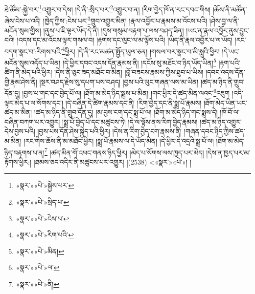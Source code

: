 ཐེ་ཚོམ་:སྐྱེ་བར་\footnote{«སྣར་»«པེ་»སྐྱེས་པར་}འགྱུར་བ་དེས། །དེ་ནི་:སྲིད་པར་\footnote{«སྣར་»«པེ་»སྲིད་པ་}འགྱུར་བ་ན། །རིག་བྱེད་ཁོ་ན་རང་དབང་གིས། །ཆོས་ནི་མཚོན་ཞེས་ངེས་པ་འདི། །ཁྱེད་ཀྱིས་:ངེས་པར་\footnote{«སྣར་»«པེ་»ངེས་པ་}གྲུབ་འགྱུར་མིན། །རྣལ་འབྱོར་པ་རྣམས་མ་འོངས་པའི། །ཤེས་བྱ་ལ་ནི་མངོན་སུམ་གྱིས། །ནུས་པ་ཇི་ལྟར་ཡོད་དེ་ནི། །དུས་གསུམ་བརྟག་པ་ལས་བཤད་ཟིན། །ཡང་ན་རྣལ་འབྱོར་ནུས་བྱུང་བའི། །འདས་དང་མ་འོངས་ལྟར་གསལ་བ། །རྟགས་དང་ལུང་ལ་མ་ལྟོས་པའི། །ཡིད་ནི་རྣལ་འབྱོར་པ་ལ་ཡོད། །རང་བདག་སྣང་བ་:རིགས་པའི་\footnote{«སྣར་»«པེ་»རིག་པའི་}ཕྱིར། །དེ་ནི་རང་མཚན་སྤྱོད་ཡུལ་ཅན། །གསལ་བར་སྣང་བ་མི་སླུའི་ཕྱིར། །དེ་ཡང་མངོན་སུམ་འདོད་པ་ཡིན། །དེ་ཕྱིར་དབང་འདས་དོན་རྣམས་ནི། །དངོས་སུ་མཐོང་བ་ཉིད་ཡོད་ཡིན།\footnote{«སྣར་»«པེ་»མིན།} །རྟག་པའི་ཚིག་ནི་མེད་པའི་ཕྱིར། །དེས་ནི་ཅུང་ཟད་མཐོང་བ་མིན། །བློ་བཟངས་རྣམས་ཀྱིས་ཐུབ་པ་ཡིས། །དབང་འདས་དོན་གྱི་རྣམ་ཤེས་ནི། །སྔར་བཤད་རྗེས་སུ་དཔག་པས་བཤད། །བྱས་པའི་ལུང་གཞན་ལས་མ་ཡིན། །ཚད་མ་ཉིད་ནི་གྲུབ་དོན་དུ། །བྱས་པ་གང་དང་བྱེད་པོ་ལ། །ཐོག་མ་མེད་ཉིད་སྨྲས་པ་མིན། །གང་ཕྱིར་དེ་ཚད་མིན་ལའང་\footnote{«སྣར་»«པེ་»ལ་}འཇུག །འདི་ལྟར་མེད་པ་ལ་སོགས་དང་། །དེ་བཞིན་དེ་ཚིག་རྣམས་དང་ནི། །རིག་བྱེད་དང་ནི་སྨྲ་པོ་རྣམས། །ཐོག་མེད་ཡིན་ཡང་ཚད་མ་མིན། །ཚད་མ་ཉིད་ནི་གྲུབ་དོན་དུ། །མ་བྱས་ངག་དང་སྨྲ་པོ་ལ། །ཐོག་མ་མེད་ཉིད་གང་སྨྲས་དེ། །ཁོ་བོ་ལ་བཞིན་བཀག་པར་འགྱུར། །སྨྲ་པོ་བྱེད་པོ་དང་མཚུངས་ཏེ། །དེ་ལ་ལྟོས་ནས་རིག་བྱེད་རྣམས། །ཚད་མ་ཉིད་འགྱུར་དེས་བྱས་པའི། །བྱས་པས་དོན་ཤེས་སྐྱེད་པའི་ཕྱིར། །དེས་ན་རིག་བྱེད་ངག་རྣམས་ནི། །གཞན་དབང་ཉིད་ཀྱིས་ཚད་མ་མིན། །རང་གིས་ཆོས་ནི་མ་མཐོང་ཕྱིར། །སྨྲ་པོ་རྣམས་ལ་དེ་ཡོད་མིན། །དེ་ཕྱིར་དེ་འདྲའི་སྨྲ་པོ་ལ། །ཐོག་མ་མེད་ཉིད་བརྟགས་པ་ན།\footnote{«སྣར་»«པེ་»ནི།} །ཚད་མིན་གོ་འཕང་གནས་ཉིད་ཕྱིར། །མེད་པ་སོགས་ལས་ཁྱད་པར་མེད། །དེས་ན་ཁྱད་པར་མ་རྟོགས་ཕྱིར:། །ཐམས་ཅད་འདིར་ནི་མཚུངས་པར་འགྱུར། །(2538) <«སྣར་»«པེ་»། །
